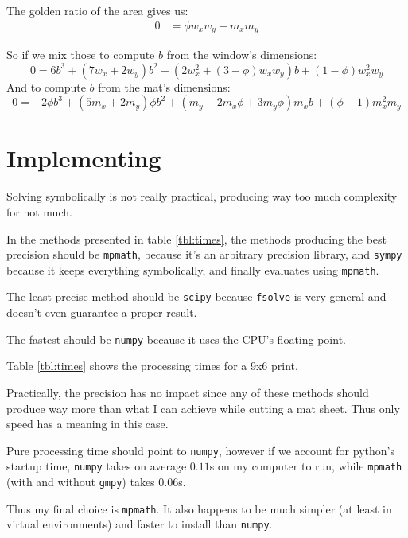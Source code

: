 \documentclass[
    paper=letter,
    parskip=half-,
    DIV=10,
]{scrreprt}
\begin{document}
    The golden ratio of the area gives us:
    \begin{align}
        0 &= \phi w_x w_y - m_x m_y
    \end{align}

    So if we mix those to compute $b$ from the window's dimensions:
    \begin{equation}\label{eq:bwin}
        0 = 6b^3 + (7w_x + 2w_y)b^2 + (2w_x^2 + (3 - \phi)w_xw_y)b + (1 - \phi)w_x^2w_y
    \end{equation}
    And to compute $b$ from the mat's dimensions:
    \begin{equation}\label{eq:bmat}
        0 = -2\phi b^3 + (5m_x + 2m_y)\phi b^2 + (m_y - 2m_x\phi + 3m_y\phi)m_xb + (\phi - 1)m_x^2m_y
    \end{equation}


\chapter{Implementing}

Solving symbolically is not really practical, producing way too much complexity for not much.

In the methods presented in table \ref{tbl:times}, the methods producing the best precision should be \texttt{mpmath}, because it's an arbitrary precision library, and \texttt{sympy} because it keeps everything symbolically, and finally evaluates using \texttt{mpmath}.

The least precise method should be \texttt{scipy} because \texttt{fsolve} is very general and doesn't even guarantee a proper result.

The fastest should be \texttt{numpy} because it uses the CPU's floating point.

Table \ref{tbl:times} shows the processing times for a 9x6 print.

Practically, the precision has no impact since any of these methods should produce way more than what I can achieve while cutting a mat sheet. Thus only speed has a meaning in this case.

Pure processing time should point to \texttt{numpy}, however if we account for python’s startup time, \texttt{numpy} takes on average $0.11$s on my computer to run, while \texttt{mpmath} (with and without \texttt{gmpy}) takes $0.06$s.

Thus my final choice is \texttt{mpmath}. It also happens to be much simpler (at least in virtual environments) and faster to install than \texttt{numpy}.
\end{document}
